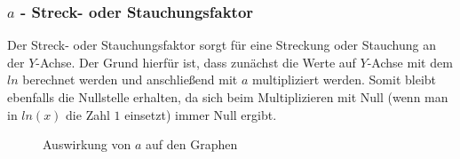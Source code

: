 \subsubsection{$a$ - Streck- oder Stauchungsfaktor}
Der Streck- oder Stauchungsfaktor sorgt für eine Streckung oder Stauchung an der $Y$-Achse. Der Grund hierfür ist, dass zunächst die Werte auf $Y$-Achse mit dem $ln$ berechnet werden und anschließend mit $a$ multipliziert werden. Somit bleibt ebenfalls die Nullstelle erhalten, da sich beim Multiplizieren mit Null (wenn man in $ln(x)$ die Zahl $1$ einsetzt) immer Null ergibt. 
\begin{figure}[h]
\centering
	\caption{Auswirkung von $a$ auf den Graphen}
\end{figure}
\pagebreak
